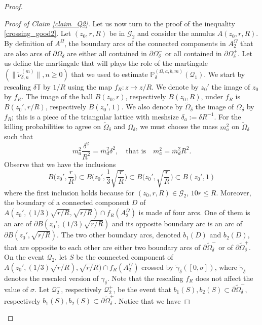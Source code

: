 \documentclass{article}
\newcommand{\PP}{{\mathbb{P}}}
\theoremstyle{definition}
\theoremstyle{remark}
\theoremstyle{remark}
\begin{document}
\begin{proof}
\begin{proof}[Proof of Claim \ref{claim_Q2}]
Let us now turn to the proof of the inequality \eqref{crossing_good2}. Let $(z_0,r,R)$ be in $\mathcal{G}_2$ and consider the annulus $A(z_0,r,R)$. By definition of $A^{\Omega}$, the boundary arcs of the connected components in $A_2^{\Omega}$ that are also arcs of $\partial \Omega_{\delta}$ are either all contained in $\partial \Omega_{\delta}^{-}$ or all contained in $\partial \Omega_{\delta}^{+}$. Let us define the martingale that will plays the role of the martingale $(\| \tilde \nu^{(m)}_{\delta, n}\|, n \geq 0)$ that we used to estimate $\PP_{\delta}^{(\Omega,a,b,m)}(\mathcal{Q}_1)$. We start by rescaling $\delta \mathbb{T}$ by $1/R$ using the map $f_R: z \mapsto z/R$. We denote by $z_0'$ the image of $z_0$ by $f_R$. The image of the ball $B(z_0,r)$, respectively $B(z_0,R)$, under $f_R$ is $B(z_0',r/R)$, respectively $B(z_0',1)$. We also denote by $\tilde \Omega_{\delta}$ the image of $\Omega_{\delta}$ by $f_R$; this is a piece of the triangular lattice with meshsize $\delta_{a} := \delta R^{-1}$. For the killing probabilities to agree on $\tilde \Omega_{\delta}$ and $\Omega_{\delta}$, we must choose the mass $m_{a}^{2}$ on $\tilde \Omega_{\delta}$ such that
\begin{equation*}
    m_a^2 \frac{\delta^2}{R^2} = \overline{m}_d^2 \delta^2, \quad \text{that is} \quad m_a^2= \overline{m}_d^2R^2.
\end{equation*}
Observe that we have the inclusions
\begin{equation*}
    B\big(z_0', \frac{r}{R} \big) \subset B\big(z_0', \frac{1}{3}\sqrt{\frac{r}{R}}\big) \subset B \big(z_0', \sqrt{\frac{r}{R}} \big) \subset B(z_0',1)
\end{equation*}
where the first inclusion holds because for $(z_0,r,R) \in \mathcal{G}_2$, $10r \leq R$. Moreover, the boundary of a connected component $D$ of $A(z_0', (1/3)\sqrt{r/R}, \sqrt{r/R}) \cap f_R(A_2^{\Omega})$ is made of four arcs. One of them is an arc of $\partial B(z_0', (1/3)\sqrt{r/R})$ and its opposite boundary arc is an arc of $\partial B(z_0', \sqrt{r/R})$. The two other boundary arcs, denoted $b_1(D)$ and $b_2(D)$, that are opposite to each other are either two boundary arcs of $\partial \tilde \Omega_{\delta}^{-}$ or of $\partial \tilde \Omega_{\delta}^{+}$. On the event $\mathcal{Q}_{2}$, let $S$ be the connected component of $A(z_0', (1/3)\sqrt{r/R}), \sqrt{r/R}) \cap f_R(A_{2}^{\Omega})$ crossed by $\tilde \gamma_{\delta}([0,\sigma])$, where $\tilde \gamma_{\delta}$ denotes the rescaled version of $\gamma_{\delta}$. Note that the rescaling $f_R$ does not affect the value of $\sigma$. Let $\mathcal{Q}_{2}^{-}$, respectively $\mathcal{Q}_{2}^{+}$, be the event that $b_1(S), b_2(S) \subset \partial \tilde \Omega_{\delta}^{-}$, respectively $b_1(S), b_2(S) \subset \partial \tilde \Omega_{\delta}^{+}$. Notice that we have

\end{proof}
\end{proof}
\end{document}
